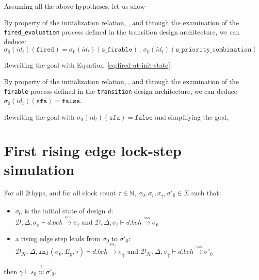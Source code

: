 \documentclass[dvipsnames,12pt]{article}
\begin{document}
\begin{niproof}
  Assuming all the above hypotheses, let us show

  By property of the initialization relation, \InCsCompT, and through
  the examination of the \texttt{fired\_evaluation} process defined in
  the transition design architecture, we can deduce:
  \begin{equation}
    \label{eq:fired-at-init-state}
    \sigma_0(id_t)(\texttt{fired})=\sigma_0(id_t)(\texttt{s\_firable})~.~\sigma_0(id_t)(\texttt{s\_priority\_combination})
  \end{equation}

  Rewriting the goal with Equation~\eqref{eq:fired-at-init-state}:
  
  By property of the initialization relation, \InCsCompT, and through
  the examination of the \texttt{firable} process defined in the
  \texttt{transition} design architecture, we can deduce
  $\sigma_0(id_t)(\texttt{sfa})=\mathtt{false}$.

  Rewriting the goal with $\sigma_0(id_t)(\texttt{sfa})=\mathtt{false}$ and
  simplifying the goal, 
\end{niproof}

\section{First rising edge lock-step simulation}
\label{sec:fre-lock-step}

\begin{lemma}
  \label{lem:fst-re-lock-step}
  For all \hm2thyps{}, and for all clock count $\tau\in\mathbb{N}$,
  $\sigma_0,\sigma_i,\sigma_{\uparrow},\sigma'_0\in{}\Sigma$ such that:
  \begin{itemize}
  \item $\sigma_0$ is the initial state of design $d$:\\
    $\mathcal{D},\Delta,\sigma_e\vdash{}d.beh\xrightarrow{cs_i}{}\sigma_i$ and
    $\mathcal{D},\Delta,\sigma_i\vdash{}d.beh\xrightarrow{\rightsquigarrow}{}\sigma_0$
    
  \item a rising edge step leads from $\sigma_0$ to $\sigma'_0$:\\
    $\mathcal{D}_\mathcal{H},\Delta,\mathtt{inj}(\sigma_0,E_p,\tau)\vdash{}d.beh\xrightarrow{cs_{\uparrow}}\sigma_{\uparrow}$
    and
    $\mathcal{D}_\mathcal{H},\Delta,\sigma_{\uparrow}\vdash{}d.beh\xrightarrow{\rightsquigarrow}\sigma'_0$
  \end{itemize}
  then $\gamma\vdash{}s_0\stackrel{\uparrow}{\approx}\sigma'_0$.
\end{lemma}
\end{document}
